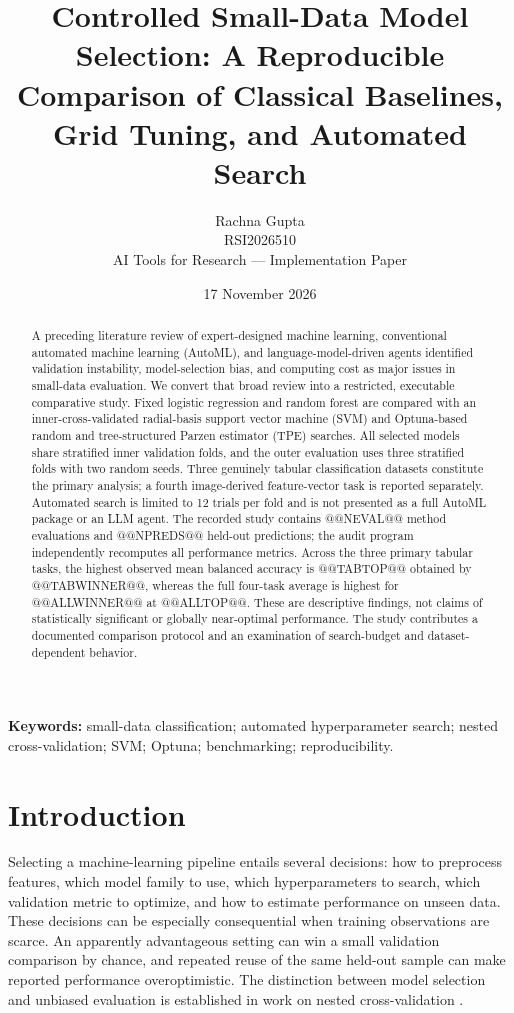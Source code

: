 \documentclass[11pt,a4paper]{article}
\title{Controlled Small-Data Model Selection: A Reproducible Comparison of Classical Baselines, Grid Tuning, and Automated Search}
\author{Rachna Gupta\\ RSI2026510\\ AI Tools for Research --- Implementation Paper}
\date{17 November 2026}
\begin{document}
\maketitle
\begin{abstract}
A preceding literature review of expert-designed machine learning, conventional automated machine learning (AutoML), and language-model-driven agents identified validation instability, model-selection bias, and computing cost as major issues in small-data evaluation. We convert that broad review into a restricted, executable comparative study. Fixed logistic regression and random forest are compared with an inner-cross-validated radial-basis support vector machine (SVM) and Optuna-based random and tree-structured Parzen estimator (TPE) searches. All selected models share stratified inner validation folds, and the outer evaluation uses three stratified folds with two random seeds. Three genuinely tabular classification datasets constitute the primary analysis; a fourth image-derived feature-vector task is reported separately. Automated search is limited to 12 trials per fold and is not presented as a full AutoML package or an LLM agent. The recorded study contains @@NEVAL@@ method evaluations and @@NPREDS@@ held-out predictions; the audit program independently recomputes all performance metrics. Across the three primary tabular tasks, the highest observed mean balanced accuracy is @@TABTOP@@ obtained by @@TABWINNER@@, whereas the full four-task average is highest for @@ALLWINNER@@ at @@ALLTOP@@. These are descriptive findings, not claims of statistically significant or globally near-optimal performance. The study contributes a documented comparison protocol and an examination of search-budget and dataset-dependent behavior.
\end{abstract}
\textbf{Keywords:} small-data classification; automated hyperparameter search; nested cross-validation; SVM; Optuna; benchmarking; reproducibility.

\section{Introduction}
Selecting a machine-learning pipeline entails several decisions: how to preprocess features, which model family to use, which hyperparameters to search, which validation metric to optimize, and how to estimate performance on unseen data. These decisions can be especially consequential when training observations are scarce. An apparently advantageous setting can win a small validation comparison by chance, and repeated reuse of the same held-out sample can make reported performance overoptimistic. The distinction between model selection and unbiased evaluation is established in work on nested cross-validation \cite{varma2006}.
\end{document}
